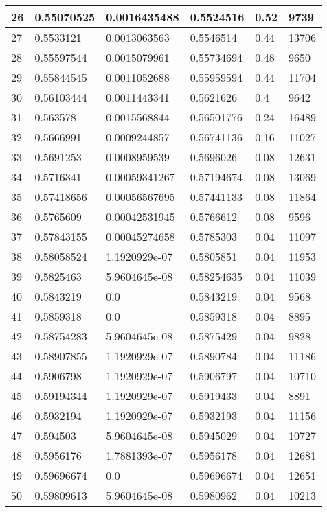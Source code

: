 \begin{longtable}{|l|l|l|l|l|l|}
26 & 0.55070525 & 0.0016435488 & 0.5524516 & 0.52 & 9739 \\ \hline 
27 & 0.5533121 & 0.0013063563 & 0.5546514 & 0.44 & 13706 \\ \hline 
28 & 0.55597544 & 0.0015079961 & 0.55734694 & 0.48 & 9650 \\ \hline 
29 & 0.55844545 & 0.0011052688 & 0.55959594 & 0.44 & 11704 \\ \hline 
30 & 0.56103444 & 0.0011443341 & 0.5621626 & 0.4 & 9642 \\ \hline 
31 & 0.563578 & 0.0015568844 & 0.56501776 & 0.24 & 16489 \\ \hline 
32 & 0.5666991 & 0.0009244857 & 0.56741136 & 0.16 & 11027 \\ \hline 
33 & 0.5691253 & 0.0008959539 & 0.5696026 & 0.08 & 12631 \\ \hline 
34 & 0.5716341 & 0.00059341267 & 0.57194674 & 0.08 & 13069 \\ \hline 
35 & 0.57418656 & 0.00056567695 & 0.57441133 & 0.08 & 11864 \\ \hline 
36 & 0.5765609 & 0.00042531945 & 0.5766612 & 0.08 & 9596 \\ \hline 
37 & 0.57843155 & 0.00045274658 & 0.5785303 & 0.04 & 11097 \\ \hline 
38 & 0.58058524 & 1.1920929e-07 & 0.5805851 & 0.04 & 11953 \\ \hline 
39 & 0.5825463 & 5.9604645e-08 & 0.58254635 & 0.04 & 11039 \\ \hline 
40 & 0.5843219 & 0.0 & 0.5843219 & 0.04 & 9568 \\ \hline 
41 & 0.5859318 & 0.0 & 0.5859318 & 0.04 & 8895 \\ \hline 
42 & 0.58754283 & 5.9604645e-08 & 0.5875429 & 0.04 & 9828 \\ \hline 
43 & 0.58907855 & 1.1920929e-07 & 0.5890784 & 0.04 & 11186 \\ \hline 
44 & 0.5906798 & 1.1920929e-07 & 0.5906797 & 0.04 & 10710 \\ \hline 
45 & 0.59194344 & 1.1920929e-07 & 0.5919433 & 0.04 & 8891 \\ \hline 
46 & 0.5932194 & 1.1920929e-07 & 0.5932193 & 0.04 & 11156 \\ \hline 
47 & 0.594503 & 5.9604645e-08 & 0.5945029 & 0.04 & 10727 \\ \hline 
48 & 0.5956176 & 1.7881393e-07 & 0.5956178 & 0.04 & 12681 \\ \hline 
49 & 0.59696674 & 0.0 & 0.59696674 & 0.04 & 12651 \\ \hline 
50 & 0.59809613 & 5.9604645e-08 & 0.5980962 & 0.04 & 10213 \\ \hline 

\end{longtable}
